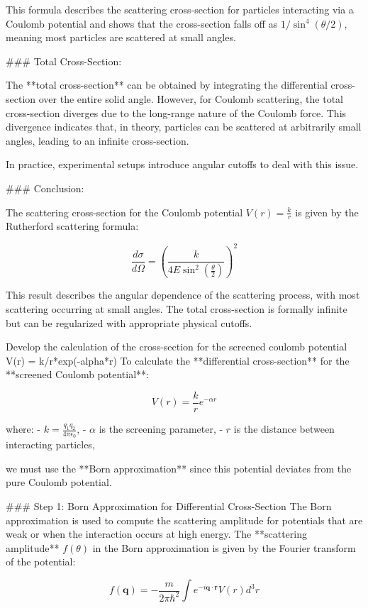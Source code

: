    This formula describes the scattering cross-section for particles interacting via a Coulomb potential and shows that the cross-section falls off as \( 1/\sin^4(\theta/2) \), meaning most particles are scattered at small angles.

### Total Cross-Section:

The **total cross-section** can be obtained by integrating the differential cross-section over the entire solid angle. However, for Coulomb scattering, the total cross-section diverges due to the long-range nature of the Coulomb force. This divergence indicates that, in theory, particles can be scattered at arbitrarily small angles, leading to an infinite cross-section.

In practice, experimental setups introduce angular cutoffs to deal with this issue.

### Conclusion:

The scattering cross-section for the Coulomb potential \( V(r) = \frac{k}{r} \) is given by the Rutherford scattering formula:

\[
\frac{d\sigma}{d\Omega} = \left( \frac{k}{4 E \sin^2\left(\frac{\theta}{2}\right)} \right)^2
\]

This result describes the angular dependence of the scattering process, with most scattering occurring at small angles. The total cross-section is formally infinite but can be regularized with appropriate physical cutoffs.

Develop the calculation of the cross-section for the screened coulomb potential V(r) = k/r*exp(-alpha*r)
To calculate the **differential cross-section** for the **screened Coulomb potential**:

\[
V(r) = \frac{k}{r} e^{-\alpha r}
\]

where:
- \( k = \frac{q_1 q_2}{4\pi \epsilon_0} \),
- \( \alpha \) is the screening parameter, 
- \( r \) is the distance between interacting particles,

we must use the **Born approximation** since this potential deviates from the pure Coulomb potential.

### Step 1: Born Approximation for Differential Cross-Section
The Born approximation is used to compute the scattering amplitude for potentials that are weak or when the interaction occurs at high energy. The **scattering amplitude** \( f(\theta) \) in the Born approximation is given by the Fourier transform of the potential:

\[
f(\mathbf{q}) = -\frac{m}{2\pi \hbar^2} \int e^{-i\mathbf{q} \cdot \mathbf{r}} V(r) d^3r
\]

